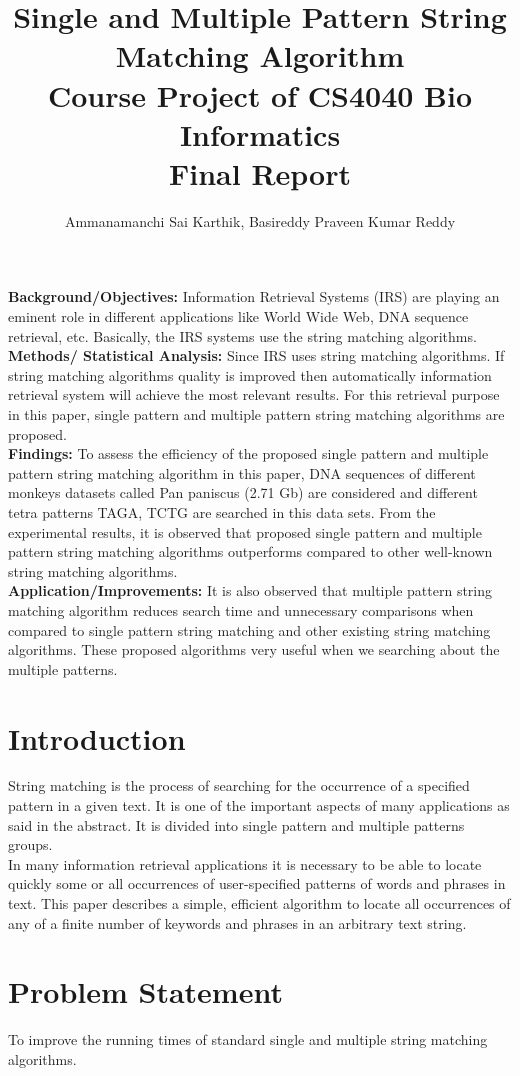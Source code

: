 \documentclass[a4paper,11pt,twocolumn]{article}
\title{Single and Multiple Pattern String Matching
Algorithm \\ {\normalsize Course Project of CS4040 Bio Informatics \\Final Report}}\author{Ammanamanchi Sai Karthik, Basireddy Praveen Kumar Reddy }
\begin{document}
\maketitle
\abstract{}\textbf{Background/Objectives:} Information Retrieval Systems (IRS) are playing an eminent role in different applications like
World Wide Web, DNA sequence retrieval, etc. Basically, the IRS systems use the string matching algorithms.\\
 \textbf{Methods/
Statistical Analysis:} Since IRS uses string matching algorithms. If string matching algorithms quality is improved then
automatically information retrieval system will achieve the most relevant results. For this retrieval purpose in this paper,
single pattern and multiple pattern string matching algorithms are proposed.\\
 \textbf{Findings:} To assess the efficiency of the
proposed single pattern and multiple pattern string matching algorithm in this paper, DNA sequences of different monkeys
datasets called Pan paniscus (2.71 Gb) are considered and different tetra patterns TAGA, TCTG are searched in this
data sets. From the experimental results, it is observed that proposed single pattern and multiple pattern string matching
algorithms outperforms compared to other well-known string matching algorithms.\\
 \textbf{Application/Improvements:} It is
also observed that multiple pattern string matching algorithm reduces search time and unnecessary comparisons when
compared to single pattern string matching and other existing string matching algorithms. These proposed algorithms
very useful when we searching about the multiple patterns.
\section{Introduction}
String matching is the process of searching for the occurrence
of a specified pattern in a given text. It is one of
the important aspects of many applications as said in the
abstract. It is divided into single pattern and multiple patterns
groups.\\
In many information retrieval applications it is necessary to be able to locate quickly some or all occurrences of user-specified patterns of words and
phrases in text. This paper describes a simple, efficient
algorithm to locate all occurrences of any of a finite
number of keywords and phrases in an arbitrary text
string.

\section{Problem Statement}
To improve the running times of standard single and multiple string matching algorithms.\\
\end{document}
